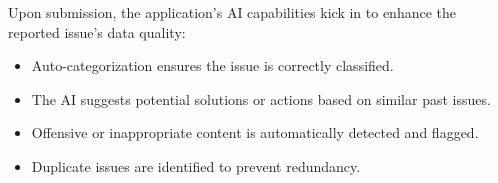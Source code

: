 Upon submission, the application's AI capabilities kick in to enhance the reported issue's data quality:
\begin{itemize}
    \item Auto-categorization ensures the issue is correctly classified.
    \item The AI suggests potential solutions or actions based on similar past issues.
    \item Offensive or inappropriate content is automatically detected and flagged.
    \item Duplicate issues are identified to prevent redundancy.
\end{itemize}